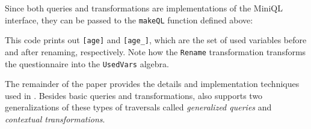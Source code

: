 Since both queries and transformations are implementations of the MiniQL interface, they can be passed to the \lstinline{makeQL} function defined above:

This code prints out  \lstinline{[age]} and \lstinline{[age_]}, which
are the set of used variables before and after renaming, respectively.
Note how the \lstinline{Rename} transformation transforms the questionnaire into the \lstinline{UsedVars} algebra.

The remainder of the paper provides the details and implementation
techniques used in \Name. Besides basic queries and transformations,
\name also supports two generalizations of these types of traversals
called \emph{generalized queries} and \emph{contextual transformations}.

